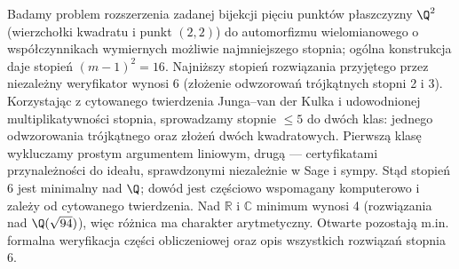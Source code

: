 Badamy problem rozszerzenia zadanej bijekcji pięciu punktów płaszczyzny $\Q^2$ (wierzchołki
kwadratu i punkt $(2,2)$) do automorfizmu wielomianowego o współczynnikach wymiernych
możliwie najmniejszego stopnia; ogólna konstrukcja daje stopień $(m-1)^2=16$.
Najniższy stopień rozwiązania przyjętego przez niezależny weryfikator wynosi 6 (złożenie
odwzorowań trójkątnych stopni 2 i 3).
Korzystając z cytowanego twierdzenia Junga--van der Kulka i udowodnionej multiplikatywności
stopnia, sprowadzamy stopnie $\le5$ do dwóch klas: jednego odwzorowania trójkątnego oraz
złożeń dwóch kwadratowych.
Pierwszą klasę wykluczamy prostym argumentem liniowym, drugą --- certyfikatami
przynależności do ideału, sprawdzonymi niezależnie w Sage i sympy.
Stąd stopień 6 jest minimalny nad $\Q$; dowód jest częściowo wspomagany komputerowo i zależy
od cytowanego twierdzenia.
Nad $\mathbb R$ i $\mathbb C$ minimum wynosi 4 (rozwiązania nad $\Q(\sqrt{94})$), więc różnica
ma charakter arytmetyczny.
Otwarte pozostają m.in. formalna weryfikacja części obliczeniowej oraz opis wszystkich
rozwiązań stopnia 6.
